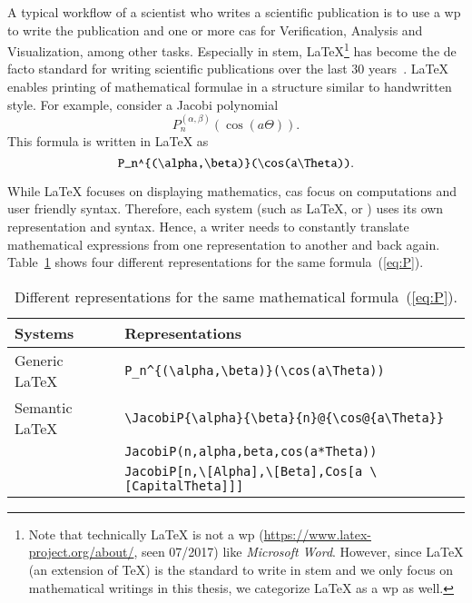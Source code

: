 A typical workflow of a scientist who writes a scientific publication is to use a \gls*{wp} to write the publication and one or more \gls*{cas} for Verification, Analysis and Visualization, among other tasks. Especially in \gls*{stem}, \LaTeX\footnote{Note that technically \LaTeX{} is not a \gls*{wp} (\url{https://www.latex-project.org/about/}, seen 07/2017) like \textit{Microsoft Word}. However, since \LaTeX{} (an extension of \TeX) is the standard to write in \gls*{stem} and we only focus on mathematical writings in this thesis, we categorize \LaTeX{} as a \gls*{wp} as well.} has become the de facto standard for writing scientific publications over the last 30 years~\parencites{LATEX:Standard}[559]{DigitalTypo}{Knuth}. \LaTeX{} enables printing of mathematical formulae in a structure similar to handwritten style. For example, consider a Jacobi polynomial~\parencite[18.3 in table 1]{NIST:DLMF}
\begin{equation}\label{eq:P}
P_n^{(\alpha , \beta)}(\cos(a\Theta)).
\end{equation}
This formula is written in \LaTeX{} as
\begin{equation}\label{eq:P-tex}
\verb|P_n^{(\alpha,\beta)}(\cos(a\Theta))|.
\end{equation}

While \LaTeX{} focuses on displaying mathematics, \gls*{cas} focus on computations and user friendly syntax. Therefore, each system (such as \LaTeX{}, \Maple{} or \Mathematica) uses its own representation and syntax. Hence, a writer needs to constantly translate mathematical expressions from one representation to another and back again. Table~\ref{tab:JacobiP-usecase} shows four different representations for the same formula~(\ref{eq:P}).

\begin{table}[ht]
	\centering
	\begin{tabular}{ll}
		\hline
		Systems & Representations \\
		\hline
		\hline
		Generic \LaTeX\ & \verb|P_n^{(\alpha,\beta)}(\cos(a\Theta))| \\ 
		Semantic \LaTeX\ & \verb|\JacobiP{\alpha}{\beta}{n}@{\cos@{a\Theta}}| \\
		\Maple & \verb|JacobiP(n,alpha,beta,cos(a*Theta))| \\ 
		\Mathematica & \verb|JacobiP[n,\[Alpha],\[Beta],Cos[a \[CapitalTheta]]]|\\
		\hline
	\end{tabular}
	\caption{Different representations for the same mathematical formula~(\ref{eq:P}).}
	\label{tab:JacobiP-usecase}
\end{table}

